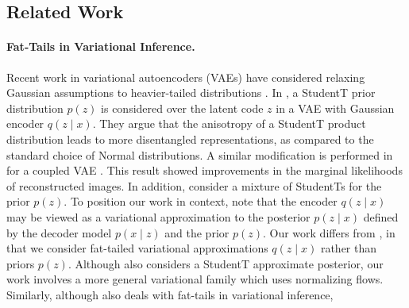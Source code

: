 \documentclass[../../thesis.tex]{subfiles}
\begin{document}
\subsection*{Related Work}
\paragraph{Fat-Tails in Variational Inference.}

Recent work in variational autoencoders (VAEs) have considered relaxing Gaussian assumptions to heavier-tailed distributions \citep{mathieu2019disentangling,chen2019residual,boenninghoff2020variational,abiri2020variational}.
In \citet{mathieu2019disentangling}, a StudentT prior distribution $p(z)$ is considered over the latent code
$z$ in a VAE with Gaussian encoder $q(z \mid x)$. They argue
that the anisotropy of a StudentT product distribution leads to more disentangled representations, as compared to the standard choice of Normal distributions.
A similar modification is performed in \citet{chen2020use} for
a coupled VAE \citep{cao2019coupled}.
This result showed improvements in the marginal
likelihoods of reconstructed images. In addition,
\citet{boenninghoff2020variational} consider a mixture of StudentTs for the
prior $p(z)$. To position
our work in context, note that the encoder $q(z \mid x)$ may be viewed
as a variational approximation to the posterior $p(z \mid x)$ defined by the
decoder model $p(x \mid z)$ and the prior $p(z)$. Our work differs from
\citet{mathieu2019disentangling,chen2020use,boenninghoff2020variational}, in
that we consider fat-tailed variational approximations $q(z \mid x)$ rather
than priors $p(z)$. Although \citet{abiri2020variational} also considers
a StudentT approximate posterior, our work involves a more general
variational family which uses normalizing flows.
Similarly, although \citet{wang2018variational} also deals with fat-tails in variational inference,
\end{document}
